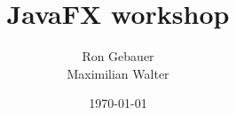 \usepackage[utf8]{inputenc}
\usepackage[ngerman]{babel}
\usepackage{amsmath}
\usepackage{amsfonts}
\usepackage{amssymb}
\usepackage{graphicx}
\usepackage{hyperref}


\title{JavaFX workshop}
\author[Ron Gebauer \& Maximlian Walter]{Ron Gebauer \\Maximilian Walter}
\date{\today}